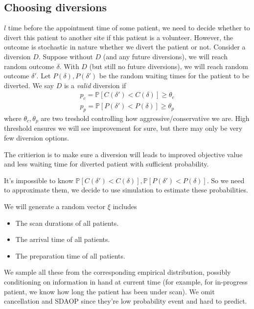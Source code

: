 \subsection{Choosing diversions}

$l$ time before the appointment time of some patient, we need to
decide whether to divert this patient to another site if this
patient is a volunteer. However, the outcome is stochastic in
nature whether we divert the patient or not. Consider a diversion
$D$. Suppose without $D$ (and any future diversions), we will
reach random outcome $\delta$. With $D$ (but still no future
diversions), we will reach random outcome $\delta'$. Let
$P(\delta), P(\delta')$ be the random waiting times for the patient 
to be diverted. We say $D$ is a \textit{valid} diversion if
\begin{align*}
  p_c = \mathbb{P}[C(\delta') < C(\delta)] \ge \theta_c   \\
  p_p = \mathbb{P}[P(\delta') < P(\delta)] \ge \theta_p
\end{align*}
where $\theta_c, \theta_p$ are two treshold controlling how
aggressive/conservative we are. High threshold ensures we will
see improvement for sure, but there may only be very few
diversion options.

The critierion is to make sure a diversion will leads to
improved objective value and less waiting time for diverted
patient with sufficient probability.

It's impossible to know $\mathbb{P}[C(\delta') < C(\delta)],
\mathbb{P}[P(\delta') < P(\delta)]$. So we need to approximate
them, we decide to use simulation to estimate these probabilities.

We will generate a random vector $\xi$ includes
\begin{itemize}
\item The scan durations of all patients.
\item The arrival time of all patients.
\item The preparation time of all patients.
\end{itemize}
We sample all these from the corresponding empirical distribution,
possibly conditioning on information in hand at current time
(for example, for in-progress patient, we know how long the patient
has been under scan). We omit cancellation and SDAOP since
they're low probability event and hard to predict.

